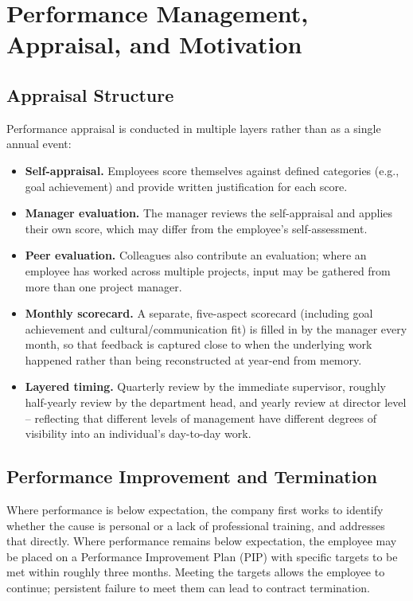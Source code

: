 \documentclass[12pt,a4paper]{report}
\begin{document}
\section{Performance Management, Appraisal, and Motivation}

\subsection*{Appraisal Structure}
Performance appraisal is conducted in multiple layers rather than as a single annual event:
\begin{itemize}[leftmargin=1.5cm]
  \item \textbf{Self-appraisal.} Employees score themselves against defined categories (e.g., goal achievement) and provide written justification for each score.
  \item \textbf{Manager evaluation.} The manager reviews the self-appraisal and applies their own score, which may differ from the employee's self-assessment.
  \item \textbf{Peer evaluation.} Colleagues also contribute an evaluation; where an employee has worked across multiple projects, input may be gathered from more than one project manager.
  \item \textbf{Monthly scorecard.} A separate, five-aspect scorecard (including goal achievement and cultural/communication fit) is filled in by the manager every month, so that feedback is captured close to when the underlying work happened rather than being reconstructed at year-end from memory.
  \item \textbf{Layered timing.} Quarterly review by the immediate supervisor, roughly half-yearly review by the department head, and yearly review at director level -- reflecting that different levels of management have different degrees of visibility into an individual's day-to-day work.
\end{itemize}

\subsection*{Performance Improvement and Termination}
Where performance is below expectation, the company first works to identify whether the cause is personal or a lack of professional training, and addresses that directly. Where performance remains below expectation, the employee may be placed on a Performance Improvement Plan (PIP) with specific targets to be met within roughly three months. Meeting the targets allows the employee to continue; persistent failure to meet them can lead to contract termination.
\end{document}
